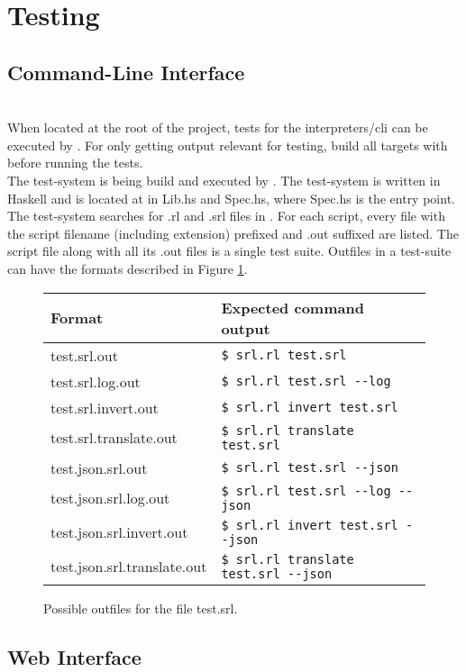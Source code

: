 \section{Testing}


\subsection{Command-Line Interface}
\\

When located at the root of the project, tests for the interpreters/cli can be executed by .
For only getting output relevant for testing, build all targets with  before running the tests.\\

The test-system is being build and executed by .
The test-system is written in Haskell and is located at  in Lib.hs and Spec.hs, where Spec.hs is the entry point.
The test-system searches for .rl and .srl files in .
For each script, every file with the script filename (including extension) prefixed and .out suffixed are listed.
The script file along with all its .out files is a single test suite.
Outfiles in a test-suite can have the formats described in Figure \ref{fig:test_suite_formats}.

\begin{figure}[H]
  \center
  \begin{tabular}{|l|l|}\hline
    \textbf{Format}             & \textbf{Expected command output}\\\hline
    test.srl.out                & \texttt{\$ srl.rl test.srl}\\\hline
    test.srl.log.out            & \texttt{\$ srl.rl test.srl {-}{-}log}\\\hline
    test.srl.invert.out         & \texttt{\$ srl.rl invert test.srl}\\\hline
    test.srl.translate.out      & \texttt{\$ srl.rl translate test.srl}\\\hline
    test.json.srl.out           & \texttt{\$ srl.rl test.srl {-}{-}json}\\\hline
    test.json.srl.log.out       & \texttt{\$ srl.rl test.srl {-}{-}log {-}{-}json}\\\hline
    test.json.srl.invert.out    & \texttt{\$ srl.rl invert test.srl {-}{-}json}\\\hline
    test.json.srl.translate.out & \texttt{\$ srl.rl translate test.srl {-}{-}json}\\\hline
  \end{tabular}
  \caption{Possible outfiles for the file test.srl.}
  \label{fig:test_suite_formats}
\end{figure}

%

\subsection{Web Interface}


\\
\\
